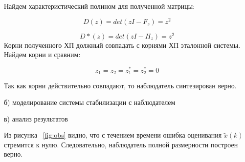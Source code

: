 \documentclass[a4paper,14pt]{extreport}
\begin{document}
\begin{enumerate}
		Найдем характеристический полином для полученной матрицы:
		
		\begin{equation}
			D(z) = det(zI - F_z) = z^2
		\end{equation}
		
		\begin{equation}
			D*(z) = det(zI - H_z) = z^2
		\end{equation}
		Корни полученного ХП должный совпадать с корнями ХП эталонной системы. Найдем корни и сравним:
		
		\begin{equation}
			z_1 = z_2 = z_1^* = z_2^* = 0
		\end{equation}
		
		Так как корни действительно совпадают, то наблюдатель синтезирован верно.
	\end{enumerate}

б) моделирование системы стабилизации с наблюдателем



	
в) анализ результатов
 
Из рисунка ~\ref{fig:obs} видно, что с течением времени ошибка оценивания $ \tilde{x} (k)$ стремится к нулю. Следовательно, наблюдатель полной размерности построен верно.
	
	
\end{document}
